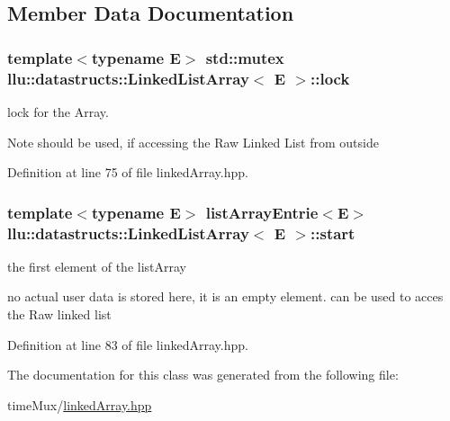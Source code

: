 \subsection{Member Data Documentation}
\hypertarget{classllu_1_1datastructs_1_1_linked_list_array_a7c9cdd61e7665e7f97447e25ca64451e}{
\subsubsection[{lock}]{\setlength{\rightskip}{0pt plus 5cm}template$<$typename E$>$ std\+::mutex {\bf llu\+::datastructs\+::\+Linked\+List\+Array}$<$ E $>$\+::lock}}\label{classllu_1_1datastructs_1_1_linked_list_array_a7c9cdd61e7665e7f97447e25ca64451e}


lock for the Array. 

\begin{DoxyNote}{Note}
should be used, if accessing the Raw Linked List from outside 
\end{DoxyNote}


Definition at line 75 of file linked\+Array.\+hpp.

\hypertarget{classllu_1_1datastructs_1_1_linked_list_array_ac6470a016e4ca99b16ab57db1b6f1f26}{
\subsubsection[{start}]{\setlength{\rightskip}{0pt plus 5cm}template$<$typename E$>$ {\bf list\+Array\+Entrie}$<$E$>$ {\bf llu\+::datastructs\+::\+Linked\+List\+Array}$<$ E $>$\+::start}}\label{classllu_1_1datastructs_1_1_linked_list_array_ac6470a016e4ca99b16ab57db1b6f1f26}


the first element of the list\+Array 

no actual user data is stored here, it is an empty element. can be used to acces the Raw linked list 

Definition at line 83 of file linked\+Array.\+hpp.



The documentation for this class was generated from the following file\+:\begin{DoxyCompactItemize}
\item 
time\+Mux/\hyperlink{linked_array_8hpp}{linked\+Array.\+hpp}\end{DoxyCompactItemize}

